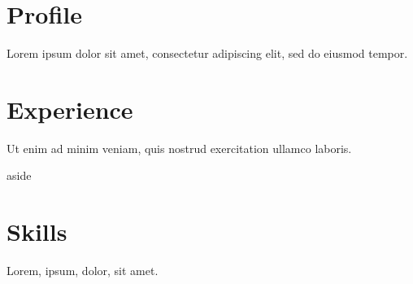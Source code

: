 \documentclass{vitae}
\begin{document}
\placeaside
\section{Profile}
Lorem ipsum dolor sit amet, consectetur
adipiscing elit, sed do eiusmod tempor.
\section{Experience}
Ut enim ad minim veniam, quis nostrud
exercitation ullamco laboris.
\begin{region}{aside}
  \section{Skills}
  Lorem, ipsum, dolor, sit amet.
\end{region}
\end{document}
